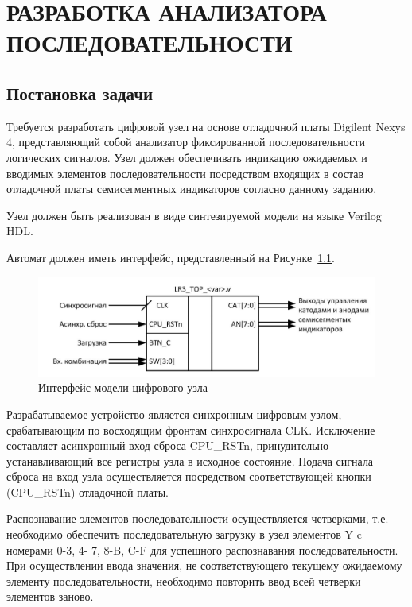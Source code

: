 \chapter{РАЗРАБОТКА АНАЛИЗАТОРА ПОСЛЕДОВАТЕЛЬНОСТИ}
\section{Постановка задачи}	



Требуется разработать цифровой узел на основе отладочной платы Digilent Nexys 4,
представляющий собой анализатор фиксированной последовательности логических
сигналов. Узел должен обеспечивать индикацию ожидаемых и вводимых элементов
последовательности посредством входящих в состав отладочной платы семисегментных
индикаторов согласно данному заданию.

Узел должен быть реализован в виде синтезируемой модели на языке Verilog HDL.

Автомат должен иметь интерфейс, представленный на Рисунке~\ref{fig:interface-pract3}.

\begin{figure}[h!]
	\centering
	\includegraphics[width=0.7\linewidth]{course-plis/images/lab3/interface-pract3}
	\caption{Интерфейс модели цифрового узла}
	\label{fig:interface-pract3}
\end{figure}


Разрабатываемое устройство является синхронным цифровым узлом,
срабатывающим по восходящим фронтам синхросигнала CLK. Исключение составляет
асинхронный вход сброса CPU\_RSTn, принудительно устанавливающий все регистры
узла в исходное состояние. Подача сигнала сброса на вход узла осуществляется
посредством соответствующей кнопки (CPU\_RSTn) отладочной платы.

Распознавание элементов последовательности осуществляется четверками, т.е.
необходимо обеспечить последовательную загрузку в узел элементов Y c номерами 0-3, 4-
7, 8-B, C-F для успешного распознавания последовательности. При осуществлении ввода
значения, не соответствующего текущему ожидаемому элементу последовательности,
необходимо повторить ввод всей четверки элементов заново.




